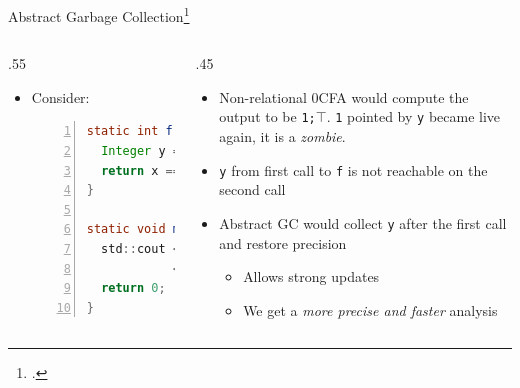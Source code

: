 \documentclass[aspectratio=169,14pt]{beamer}
\begin{document}
\begin{frame}[fragile]{Abstract Garbage Collection\footcite{might2006improving}}
  \small
  \begin{columns}
    \begin{column}{.55\textwidth}
        \begin{itemize}
        \item Consider:
          \begin{lstlisting}[language=Java,numbers=left,columns=flexible,basewidth=0.45em]
static int f(int x) {
  Integer y = new Integer(x);
  return x == (int)y;
}

static void main(string[] args) {
  std::cout << f(1) << ';'
            << f(2) << endl;
  return 0;
}
          \end{lstlisting}
        \end{itemize}
    \end{column}
    \begin{column}{.45\textwidth}
      \pause
      \begin{itemize}[<+->]
      \item Non-relational 0CFA would compute the output to be \alert<2>{\texttt{1;$\top$}}. \texttt{1} pointed by \texttt{y} became live again, it is a \emph{zombie}.
      \item \texttt{y} from first call to \texttt{f} is not reachable on the second call
      \item Abstract GC would collect \texttt{y} after the first call and restore precision \pause
        \begin{itemize}[<+->] \footnotesize
        \item Allows strong updates
        \item We get a \emph{more precise and faster} analysis
        \end{itemize}
      \end{itemize}
    \end{column}
  \end{columns}
\end{frame}
\end{document}
